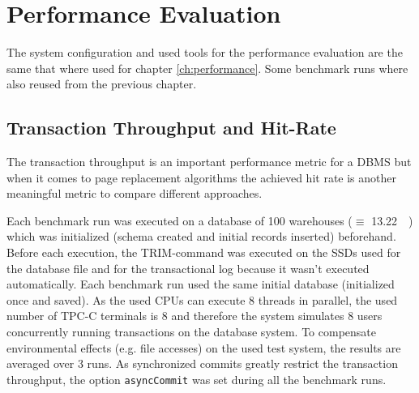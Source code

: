 %
%
%

\section{Performance Evaluation}

	The system configuration and used tools for the performance evaluation are the same that where used for chapter \ref{ch:performance}. Some benchmark runs where also reused from the previous chapter.

\subsection{Transaction Throughput and Hit-Rate} \label{subsec:throughputandhitrate}

	The transaction throughput is an important performance metric for a DBMS but when it comes to page replacement algorithms the achieved hit rate is another meaningful metric to compare different approaches. 
	
	Each benchmark run was executed on a database of 100 warehouses ($\equiv$ \SI{13.22}{\gibi\byte}) which was initialized (schema created and initial records inserted) beforehand. Before each execution, the TRIM-command was executed on the SSDs used for the database file and for the transactional log because it wasn't executed automatically. Each benchmark run used the same initial database (initialized once and saved). As the used CPUs can execute 8 threads in parallel, the used number of TPC-C terminals is 8 and therefore the system simulates 8 users concurrently running transactions on the database system. To compensate environmental effects (e.g. file accesses) on the used test system, the results are averaged over 3 runs. As synchronized commits greatly restrict the transaction throughput, the option \lstinline{asyncCommit} was set during all the benchmark runs.
		

